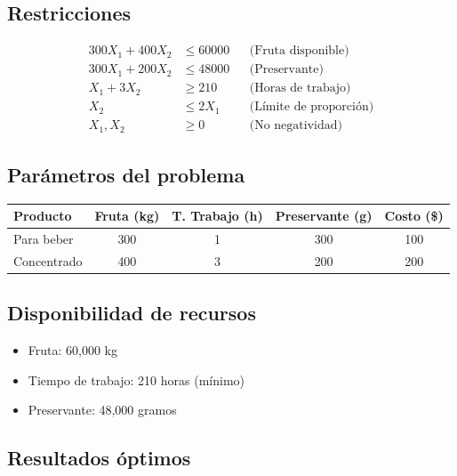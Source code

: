 \documentclass[12pt, a4paper, oneside]{book}
\theoremstyle{definition}
\begin{document}
    \subsection{Restricciones}
    \begin{align*}
    300X_1 + 400X_2 &\leq 60000 && \text{(Fruta disponible)} \\
    300X_1 + 200X_2 &\leq 48000 && \text{(Preservante)} \\
    X_1 + 3X_2 &\geq 210 && \text{(Horas de trabajo)} \\
    X_2 &\leq 2X_1 && \text{(Límite de proporción)} \\
    X_1, X_2 &\geq 0 && \text{(No negatividad)}
    \end{align*}

    \subsection{Parámetros del problema}

    \begin{table}[h]
    \centering
    \begin{tabular}{lcccc}
    \toprule
    \textbf{Producto} & \textbf{Fruta (kg)} & \textbf{T. Trabajo (h)} & \textbf{Preservante (g)} & \textbf{Costo (\$)} \\
    \midrule
    Para beber        & 300                 & 1                       & 300                      & 100                \\
    Concentrado       & 400                 & 3                       & 200                      & 200                \\
    \bottomrule
    \end{tabular}
    \end{table}

    \subsection{Disponibilidad de recursos}

    \begin{itemize}
        \item Fruta: 60,000 kg
        \item Tiempo de trabajo: 210 horas (mínimo)
        \item Preservante: 48,000 gramos
    \end{itemize}

    \subsection{Resultados óptimos}
\end{document}

